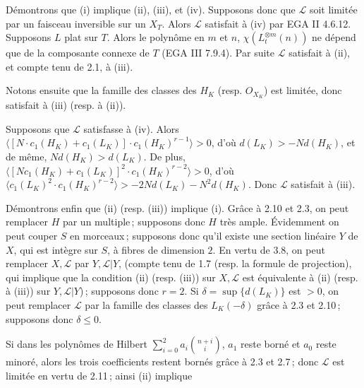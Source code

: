 
D\'
emontrons que (i) implique (ii), (iii), et (iv). Supposons donc que \(\mathcal L\) soit limit\'ee par un faisceau inversible sur un \(X_T\). Alors \(\mathcal L\) satisfait \`a (iv) par EGA II 4.6.12. Supposons \(L\) plat sur \(T\). Alors le polyn\^ome en \(m\) et \(n\), \(\chi(L_t^{\otimes m}(n))\) ne d\'epend que de la composante connexe de \(T\) (EGA III 7.9.4). Par suite \(\mathcal L\) satisfait \`a (ii), et compte tenu de 2.1, \`a (iii).

Notons ensuite que la famille des classes des \(H_K\) (resp. \({O}_{X_K}\)) est limit\'ee, donc satisfait \`a (iii) (resp. \`a (ii)).

Supposons que \(\mathcal L\) satisfasse \`a (iv). Alors \(\langle [N\cdot c_1(H_K)+c_1(L_K)]\cdot c_1(H_K)^{r-1}\rangle>0\), d'o\`u \(d(L_K)>-Nd(H_K)\), et de m\^eme, \(Nd(H_K)>d(L_K)\). De plus, \(\langle [N c_1(H_K)+c_1(L_K)]^2\cdot c_1(H_K)^{r-2}\rangle>0\), d'o\`u \(\langle c_1(L_K)^2\cdot c_1(H_K)^{r-2}\rangle>-2Nd(L_K)-N^2d(H_K)\). Donc \(\mathcal L\) satisfait \`a (iii).

D\'emontrons enfin que (ii) (resp. (iii)) implique (i). Gr\^ace \`a 2.10 et 2.3, on peut remplacer \(H\) par un multiple\,; supposons donc \(H\) tr\`es ample. \'Evidemment on peut couper \(S\) en morceaux\,; supposons donc qu'il existe une section lin\'eaire \(Y\) de \(X\), qui est int\`egre sur \(S\), \`a fibres de dimension \(2\). En vertu de 3.8, on peut remplacer \(X,\mathcal L\) par \(Y,\mathcal L|Y\), (compte tenu de 1.7 (resp. la formule de projection), qui implique que la condition (ii) (resp. (iii)) sur \(X,\mathcal L\) est \'equivalente \`a (ii) (resp. \`a (iii)) sur \(Y,\mathcal L|Y\))\,; supposons donc \(r=2\). Si \(\delta=\sup\{d(L_K)\}\) est \(>0\), on peut remplacer \(\mathcal L\) par la famille des classes des \(L_K(-\delta)\) gr\^ace \`a 2.3 et 2.10\,; supposons donc \(\delta\le0\).

Si dans les polyn\^omes de Hilbert \(\sum_{i=0}^{2}a_i\binom{n+i}{i}\), \(a_1\) reste born\'e et \(a_0\) reste minor\'e, alors les trois coefficients restent born\'es gr\^ace \`a 2.3 et 2.7\,; donc \(\mathcal L\) est limit\'ee en vertu de 2.11\,; ainsi (ii) implique
